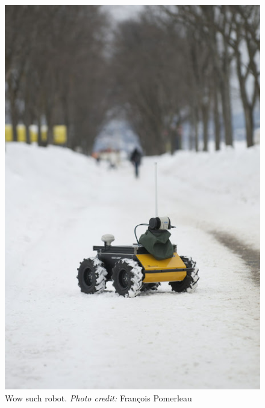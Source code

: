\begin{figure}
    \centering
    \includegraphics[width=0.95\linewidth]{img/chap_slam/husky.jpg}
    \caption{Wow such robot. \emph{Photo credit:} François Pomerleau}
    \label{fig:chap_slam_husky}
\end{figure}

